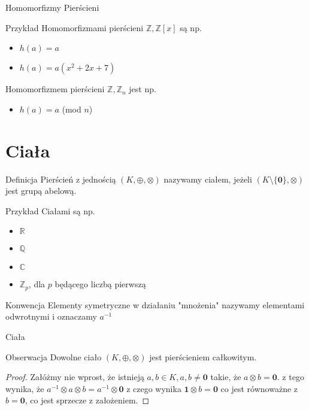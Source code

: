 \documentclass{beamer}
\newcommand{\zero}{\mathbf{0}}
\newcommand{\one}{\mathbf{1}}
\begin{document}
\begin{frame}{Homomorfizmy Pierścieni}
    \begin{exampleblock}{Przykład}
        Homomorfizmami pierścieni $\mathbb{Z}, \mathbb{Z}[x]$ są np.
        \begin{itemize}
            \item $h(a) = a$
            \item $h(a) = a(x^2 + 2x +7)$
        \end{itemize}
        Homomorfizmem pierścieni $\mathbb{Z}, \mathbb{Z}_n$ jest np.
        \begin{itemize}
            \item $h(a) = a $ (mod $n$)
        \end{itemize}
    \end{exampleblock}
\end{frame}

\section{Ciała}

\begin{frame}
    \begin{block}{Definicja}
        Pierścień z jednością $(K, \oplus, \otimes)$ nazywamy ciałem, jeżeli $(K\setminus \{\zero\}, \otimes)$ jest grupą abelową.
    \end{block}
    \begin{exampleblock}{Przykład}
        Ciałami są np.
        \begin{itemize}
            \item $\mathbb{R}$
            \item $\mathbb{Q}$
            \item $\mathbb{C}$
            \item $\mathbb{Z}_p$, dla $p$ będącego liczbą pierwszą
        \end{itemize}
    \end{exampleblock}
    \begin{alertblock}{Konwencja}
        Elementy symetryczne w działaniu "mnożenia" nazywamy elementami odwrotnymi i oznaczamy $a^{-1}$
    \end{alertblock}
\end{frame}

\begin{frame}{Ciała}
    \begin{block}{Obserwacja}
        Dowolne ciało $(K, \oplus, \otimes)$ jest pierścieniem całkowitym.
    \end{block}
    \pause 
    \begin{proof}
        Załóżmy nie wprost, że istnieją $ a,b \in K, a,b \neq \mathbf{0 }$ takie, że $ a \otimes b = \zero $. z tego wynika, że
        $a^{-1} \otimes a \otimes b = a^{-1} \otimes \zero $ z czego wynika $ \one \otimes b = \zero $ co jest równoważne z $b = \zero$, co jest sprzecze z założeniem.    
    \end{proof}
\end{frame}
\end{document}
